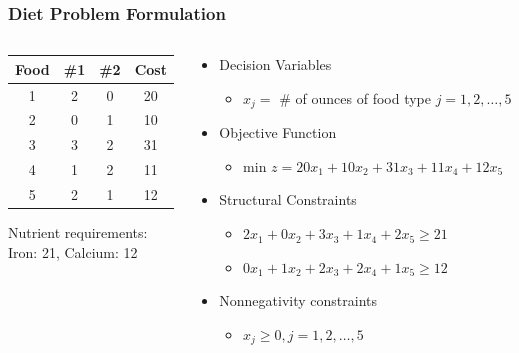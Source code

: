 \documentclass[12pt,handout]{beamer}
\begin{document}
\begin{frame}
\frametitle{Diet Problem Formulation}
\begin{columns}[t]
\begin{column}{4cm}
\begin{center}
\begin{tabular} {c | c | c | c}
Food & \#1 & \#2 & Cost \\
\hline
1 & 2 & 0 & 20 \\
2 & 0 & 1 & 10 \\
3 & 3 & 2 & 31 \\
4 & 1 & 2 & 11 \\
5 & 2 & 1 & 12 \\
\end{tabular}
\end{center}
Nutrient requirements: \\ Iron: 21, Calcium: 12
\end{column}
\begin{column}{7cm}
\begin{itemize}
\item Decision Variables
    \begin{itemize}
    \item $x_j = $ \# of ounces of food type $j = 1, 2, \ldots, 5$
    \end{itemize}
\item Objective Function
    \begin{itemize}
    \item min $z = 20 x_1 + 10 x_2 + 31 x_3 + 11 x_4 + 12 x_5$
    \end{itemize}
\item Structural Constraints
    \begin{itemize}
    \item $2 x_1 + 0 x_2 + 3 x_3 + 1 x_4 + 2 x_5 \ge 21$
    \item $0 x_1 + 1 x_2 + 2 x_3 + 2 x_4 + 1 x_5 \ge 12$
    \end{itemize}
\item Nonnegativity constraints
    \begin{itemize}
    \item $x_j \ge 0, j = 1, 2, \ldots, 5$
    \end{itemize}
\end{itemize}
\end{column}
\end{columns}
\end{frame}
\end{document}
